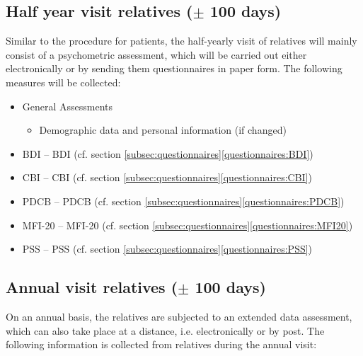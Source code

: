 \subsection{Half year visit relatives ($\pm$ 100 days)}
Similar to the procedure for patients, the half-yearly visit of relatives will mainly consist of a psychometric assessment, which will be carried out either electronically or by sending them questionnaires in paper form. The following measures will be collected:

\begin{itemize}[noitemsep,topsep=0pt]
\item General Assessments
\begin{itemize}[noitemsep,topsep=0pt]
\item Demographic data and personal information (if changed)
\end{itemize}
\item \acl{BDI} -- \acs{BDI} (cf. section \ref{subsec:questionnaires}\ref{questionnaires:BDI})
\item \acl{CBI} -- \acs{CBI} (cf. section \ref{subsec:questionnaires}\ref{questionnaires:CBI})
\item \acl{PDCB} -- \acs{PDCB} (cf. section \ref{subsec:questionnaires}\ref{questionnaires:PDCB})
\item \acl{MFI-20} -- \acs{MFI-20} (cf. section \ref{subsec:questionnaires}\ref{questionnaires:MFI20})
\item \acl{PSS} -- \acs{PSS} (cf. section \ref{subsec:questionnaires}\ref{questionnaires:PSS})
\end{itemize}

\subsection{Annual visit relatives ($\pm$ 100 days)}
On an annual basis, the relatives are subjected to an extended data assessment, which can also take place at a distance, i.e. electronically or by post. The following information is collected from relatives during the annual visit:

